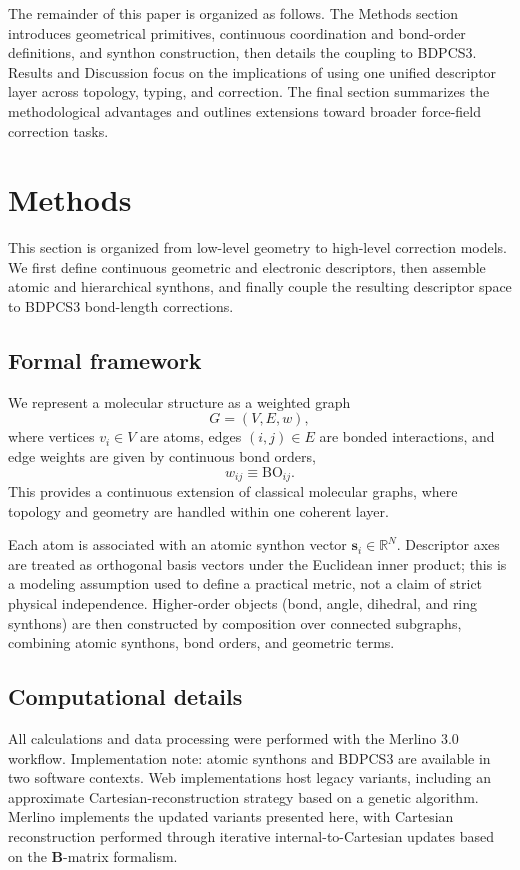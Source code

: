 \documentclass[journal=jctcce,manuscript=article]{achemso}
\begin{document}
The remainder of this paper is organized as follows. The Methods section introduces geometrical primitives, continuous coordination and bond-order definitions, and synthon construction, then details the coupling to BDPCS3. Results and Discussion focus on the implications of using one unified descriptor layer across topology, typing, and correction. The final section summarizes the methodological advantages and outlines extensions toward broader force-field correction tasks.

\section{Methods}
This section is organized from low-level geometry to high-level correction models. We first define continuous geometric and electronic descriptors, then assemble atomic and hierarchical synthons, and finally couple the resulting descriptor space to BDPCS3 bond-length corrections.

\subsection{Formal framework}
We represent a molecular structure as a weighted graph
\begin{equation}
G=(V,E,w),
\end{equation}
where vertices $v_i\in V$ are atoms, edges $(i,j)\in E$ are bonded interactions, and edge weights are given by continuous bond orders,
\begin{equation}
w_{ij}\equiv \mathrm{BO}_{ij}.
\end{equation}
This provides a continuous extension of classical molecular graphs, where topology and geometry are handled within one coherent layer.

Each atom is associated with an atomic synthon vector $\mathbf{s}_i\in\mathbb{R}^N$. Descriptor axes are treated as orthogonal basis vectors under the Euclidean inner product; this is a modeling assumption used to define a practical metric, not a claim of strict physical independence. Higher-order objects (bond, angle, dihedral, and ring synthons) are then constructed by composition over connected subgraphs, combining atomic synthons, bond orders, and geometric terms.
\subsection{Computational details}
All calculations and data processing were performed with the Merlino 3.0 workflow.
Implementation note: atomic synthons and BDPCS3 are available in two software contexts. Web implementations host legacy variants, including an approximate Cartesian-reconstruction strategy based on a genetic algorithm. Merlino implements the updated variants presented here, with Cartesian reconstruction performed through iterative internal-to-Cartesian updates based on the $\mathbf{B}$-matrix formalism.
\end{document}

